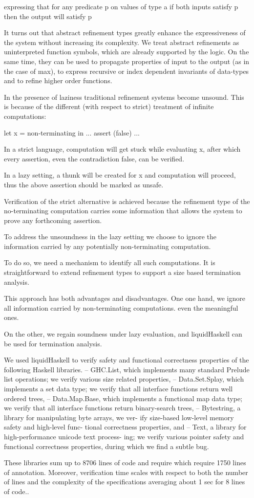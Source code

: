 expressing that for any predicate p on values of type a 
if both inputs satisfy p then the output will satisfy p

It turns out that abstract refinement types greatly enhance the expressiveness of the system
without increasing its complexity.
We treat abstract refinements as uninterpreted function symbols, which are already supported 
by the logic. On the same time, they can be used to propagate properties of input to the output (as in the case of max),
to express recursive or index dependent invariants of data-types and to refine higher order functions.

In the presence of laziness traditional refinement systems become unsound.
This is because of the different (with respect to strict) treatment of infinite computations:

let x = non-terminating
in     ... assert (false) ...

In a strict language, computation will get stuck while evaluating x, 
after which every assertion, even the contradiction false, can be verified.

In a lazy setting, a thunk will be created for x and computation will proceed, 
thus the above assertion should be marked as unsafe.

Verification of the strict alternative is achieved because the refinement type of the
no-terminating computation carries some information that allows the system to prove any 
forthcoming assertion.

To address the unsoundness in the lazy setting we choose to ignore the information carried 
by any potentially non-terminating computation.

To do so, we need a mechanism to identify all such computations.
It is straightforward to extend refinement types to support a size based termination analysis.

This approach has both advantages and disadvantages.
One one hand, we ignore all information carried by non-terminating computations.
even the meaningful ones.

On the other, we regain soundness under lazy evaluation, and 
liquidHaskell can be used for termination analysis.

We used liquidHaskell to verify safety and functional correctness properties of the following Haskell libraries.
-- GHC.List, which implements many standard Prelude list
operations; we verify various size related properties,
-- Data.Set.Splay, which implements a set data type; 
we verify that all interface functions return well ordered trees,
-- Data.Map.Base, which implements a functional map data
type; we verify that all interface functions return
binary-search trees,
-- Bytestring, a library for manipulating byte arrays, we ver-
ify size-based low-level memory safety and high-level func-
tional correctness properties, and
-- Text, a library for high-performance unicode text process-
ing; we verify various pointer safety and functional correctness
properties, during which we find a subtle bug.

These libraries sum up to 8706 lines of code and require 
which require 1750 lines of annotation.
Moreover, verification time scales
with respect to both the number of lines 
and the complexity of the specifications
averaging about 1 sec for 8 lines of code..

